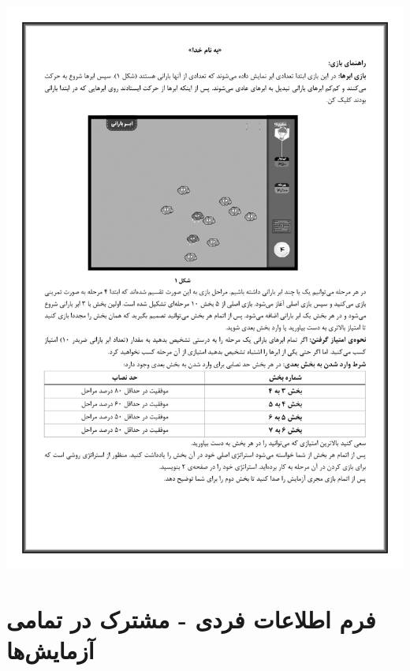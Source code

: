 \documentclass[twoside, a4paper,11pt]{book}
\numberwithin{equation}{chapter}
\numberwithin{table}{chapter}
\numberwithin{figure}{chapter}
\numberwithin{equation}{chapter}
\begin{document}
\begin{center}
\includegraphics[scale=0.8, center]{docs/InformationForm_V08.pdf}
\end{center}



\section{فرم اطلاعات فردی - مشترک در تمامی آزمایش‌ها}
\end{document}

